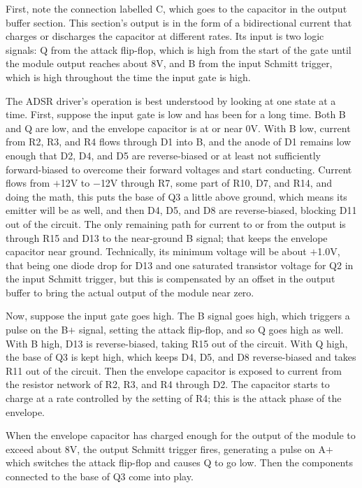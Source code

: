 First, note the connection labelled C, which goes to the capacitor in the
output buffer section.  This section's output is in the form of a
bidirectional current that charges or discharges the capacitor at different
rates.  Its input is two logic signals:  Q from the attack flip-flop, which
is high from the start of the gate until the module output reaches about 8V,
and B from the input Schmitt trigger, which is high throughout the time the
input gate is high.

The ADSR driver's operation is best understood by looking at one state at a
time.  First, suppose the input gate is low and has been for a long time. 
Both B and Q are low, and the envelope capacitor is at or near 0V.  With B
low, current from R2, R3, and R4 flows through D1 into B, and the anode of
D1 remains low enough that D2, D4, and D5 are reverse-biased or at least not
sufficiently forward-biased to overcome their forward voltages and start
conducting.  Current flows from $+$12V to $-$12V through R7, some part of
R10, D7, and R14, and doing the math, this puts the base of Q3 a little
above ground, which means its emitter will be as well, and then D4, D5, and
D8 are reverse-biased, blocking D11 out of the circuit.  The only remaining
path for current to or from the output is through R15 and D13 to the
near-ground B signal; that keeps the envelope capacitor near ground. 
Technically, its minimum voltage will be about $+$1.0V, that being one diode
drop for D13 and one saturated transistor voltage for Q2 in the input Schmitt
trigger, but this is compensated by an offset in the output buffer to bring
the actual output of the module near zero.

Now, suppose the input gate goes high.  The B signal goes high, which
triggers a pulse on the B$+$ signal, setting the attack flip-flop, and so Q
goes high as well.  With B high, D13 is reverse-biased, taking R15 out of
the circuit.  With Q high, the base of Q3 is kept high, which keeps D4, D5,
and D8 reverse-biased and takes R11 out of the circuit.  Then the envelope
capacitor is exposed to current from the resistor
network of R2, R3, and R4 through D2.  The capacitor starts to charge at a
rate controlled by the setting of R4; this is the attack phase of the
envelope.

When the envelope capacitor has charged enough for the output of the module
to exceed about 8V, the output Schmitt trigger fires, generating a pulse on
A$+$ which switches the attack flip-flop and causes Q to go low.  Then the
components connected to the base of Q3 come into play.

